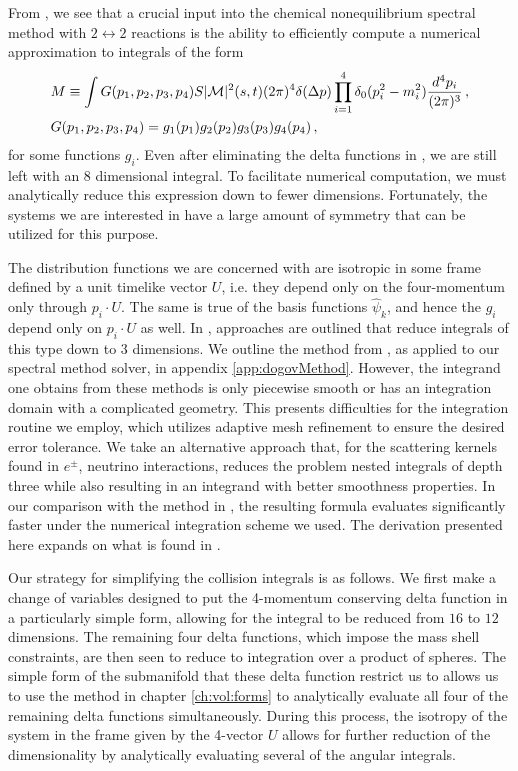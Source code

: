 From , we see that a crucial input into the chemical nonequilibrium spectral method with $2 \leftrightarrow 2$ reactions is the ability to efficiently compute a numerical approximation to integrals of the form
\begin{align}\label{coll:Ip}
&M\equiv\int G(p_1,p_2,p_3,p_4) S |\mathcal{M}|^2(s,t) (2\pi)^4\delta(\Delta p)\prod_{i=1}^4 \delta_0(p_i^2-m_i^2)\frac{d^4p_i}{(2\pi)^3}\,,\\
&G(p_1,p_2,p_3,p_4)=g_1(p_1)g_2(p_2)g_3(p_3)g_4(p_4)\,,\notag
\end{align}
for some functions $g_i$. Even after eliminating the delta functions in , we are still left with an $8$ dimensional integral.  To facilitate numerical computation, we must analytically reduce this expression down to fewer dimensions.  Fortunately, the systems we are interested in have a large amount of symmetry that  can be utilized for this purpose.  

The distribution functions we are concerned with are isotropic in some frame defined  by a unit timelike vector $U$, i.e. they depend only on the four-momentum only through $p_i\cdot U$.  The same is true of the basis functions $\hat\psi_k$, and hence the  $g_i$ depend only on $p_i\cdot U$ as well.  In \cite{Hannestad:1995rs,Dolgov:1997mb,Dolgov:1998sf}, approaches are outlined that reduce integrals of this type down to $3$ dimensions.  We outline the method from \cite{Dolgov:1997mb,Dolgov:1998sf}, as applied to our spectral method solver, in appendix \ref{app:dogovMethod}.  However, the integrand one obtains from these methods is only piecewise smooth or has an integration domain with a complicated geometry.  This presents difficulties for the integration routine we employ, which utilizes adaptive mesh refinement to ensure the desired error tolerance.  We take an alternative approach that, for the scattering kernels found in $e^\pm$, neutrino interactions, reduces the problem nested integrals  of depth three while also resulting in an integrand with better smoothness properties.  In our comparison with the method in \cite{Dolgov:1997mb,Dolgov:1998sf}, the resulting formula evaluates significantly faster under the numerical integration scheme we used.   The derivation presented here expands on what is found in \cite{Letessier:2002ony}.

Our strategy for simplifying the collision integrals is as follows.  We first make a change of variables designed to put the 4-momentum conserving delta function in a particularly simple form, allowing for the integral to be reduced from $16$ to $12$ dimensions.  The remaining four delta functions, which impose the mass shell constraints, are then seen to reduce to integration over a product of spheres.  The simple form of the submanifold that these delta function restrict us to allows us to use the method in chapter \ref{ch:vol:forms} to analytically evaluate all four of the remaining delta functions simultaneously.  During this process, the isotropy of the system in the frame given by the 4-vector $U$ allows for further reduction of the dimensionality  by analytically evaluating several of the angular integrals. 

